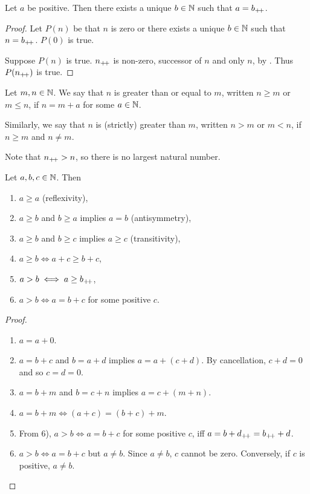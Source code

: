\begin{problem}
    Let $a$ be positive.
    Then there exists a unique $b \in \mathbb{N}$ such that $a = b_{+\!+}$.
\end{problem}
\begin{proof}
    Let $P(n)$ be that $n$ is zero or there exists a unique $b \in \mathbb{N}$ such that
    $n = b_{+\!+}$.
    $P(0)$ is true.

    Suppose $P(n)$ is true.
    $n_{+\!+}$ is non-zero, successor of $n$ and only $n$, by
    .
    Thus $P(n_{+\!+})$ is true.
\end{proof}

\begin{definition}[Order] \label{def:order}
    Let $m, n \in \mathbb{N}$.
    We say that $n$ is greater than or equal to $m$, written $n \ge m$ or
    $m \le n$, if $n = m + a$ for some $a \in \mathbb{N}$.

    Similarly, we say that $n$ is (strictly) greater than $m$, written $n > m$
    or $m < n$, if $n \ge m$ and $n \ne m$.
\end{definition}
Note that $n_{+\!+} > n$, so there is no largest natural number.

\begin{proposition} \label{thm:N:add_properties}
    Let $a, b, c \in \mathbb{N}$. Then
    \begin{enumerate}[label=\arabic*)]
        \item $a \ge a$ (reflexivity),
        \item $a \ge b$ and $b \ge a$ implies $a = b$ (antisymmetry),
        \item $a \ge b$ and $b \ge c$ implies $a \ge c$ (transitivity),
        \item $a \ge b \iff a + c \ge b + c$,
        \item $a > b \iff a \ge b_{+\!+}$,
        \item $a > b \iff a = b + c$ for some positive $c$.
    \end{enumerate}
\end{proposition}
\begin{proof} \leavevmode
    \begin{enumerate}[label=\arabic*)]
        \item $a = a + 0$.
        \item $a = b + c$ and $b = a + d$ implies $a = a + (c + d)$.
            By cancellation, $c + d = 0$ and so $c = d = 0$.
        \item $a = b + m$ and $b = c + n$ implies $a = c + (m + n)$.
        \item $a = b + m \iff (a + c) = (b + c) + m$.
        \item From 6), $a > b \iff a = b + c$ for some positive $c$, iff
            $a = b + d_{+\!+} = b_{+\!+} + d$.
        \item $a > b \iff a = b + c$ but $a \ne b$.
            Since $a \ne b$, $c$ cannot be zero.
            Conversely, if $c$ is positive, $a \ne b$. \qedhere
    \end{enumerate}
\end{proof}

